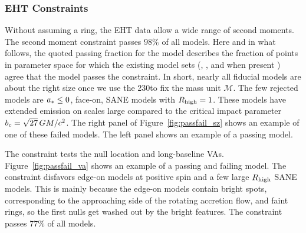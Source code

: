 \subsubsection{EHT Constraints}\label{sec:constraints}


Without assuming a ring, the EHT data allow a wide range of second moments.
The second moment constraint passes $98\%$ of all models.  Here and in what follows, the quoted passing fraction for the model describes the fraction of points in parameter space for which the existing model sets (\kharma, \bhac, and when present \hamr) agree that the model passes the constraint.
In short, nearly all fiducial models are about the right size once we use the 230\GHz to fix the mass unit $\mathcal{M}$.
The few rejected models are $a_* \le 0$, face-on, SANE models with $R_\mathrm{high} = 1$.
These models have extended emission on scales large compared to the critical impact parameter $b_c = \sqrt{27}\,GM/c^2$.
The right panel of Figure~\ref{fig:passfail_sz} shows an example of one of these failed models.  The left panel shows an example of a passing model.

\label{sec:vam}

The \vam constraint tests the null location and long-baseline VAs.  Figure~\ref{fig:passfail_va} shows an example of a passing and failing model.
The constraint disfavors edge-on models at positive spin and a few large $R_\mathrm{high}$ SANE models.
This is mainly because the edge-on models contain bright spots, corresponding to the approaching side of the rotating accretion flow, and faint rings, so the first nulls get washed out by the bright features.
The \vam constraint passes 77\% of all models.


